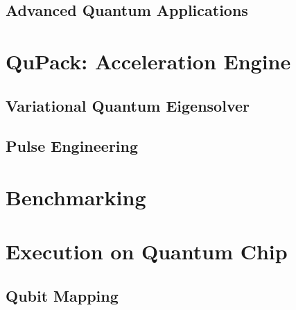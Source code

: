 \documentclass[pra,twocolumn,superscriptaddress,floatfix,nofootinbib,amsmath,amssymb]{revtex4-1}
\begin{document}
\subsection{Advanced Quantum Applications}



\section{QuPack: Acceleration Engine}


\subsection{Variational Quantum Eigensolver}


% 

% 

\subsection{Pulse Engineering}



\section{Benchmarking}
\label{sec:benchmark}



\section{Execution on Quantum Chip}

% 

\subsection{Qubit Mapping}


% 

% 


% 


\end{document}
